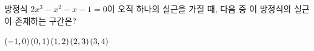 방정식 $2x^3-x^2-x-1=0$이 오직 하나의 실근을 가질 때, 다음 중 이 방정식의 실근이 존재하는 구간은?
\begin{choices32}{$(-1{,}\mkern3mu\mathopen{}0)$}{$(0{,}\mkern3mu\mathopen{}1)$}{$(1{,}\mkern3mu\mathopen{}2)$}{$(2{,}\mkern3mu\mathopen{}3)$}{$(3{,}\mkern3mu\mathopen{}4)$}\end{choices32}
